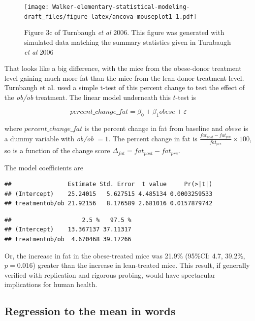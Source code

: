 \documentclass[]{book}
\begin{document}
\begin{figure}
\centering
\texttt{[image: Walker-elementary-statistical-modeling-draft\_files/figure-latex/ancova-mouseplot1-1.pdf]}
\caption{\label{fig:ancova-mouseplot1}Figure 3c of Turnbaugh \emph{et al}
2006. This figure was generated with simulated data matching the summary
statistics given in Turnbaugh \emph{et al} 2006}
\end{figure}

That looks like a big difference, with the mice from the obese-donor
treatment level gaining much more fat than the mice from the lean-donor
treatment level. Turnbaugh et al. used a simple t-test of this percent
change to test the effect of the \emph{ob/ob} treatment. The linear
model underneath this \(t\)-test is

\begin{equation}
percent\_change\_fat = \beta_0 + \beta_1 obese + \varepsilon
\end{equation}

where \(percent\_change\_fat\) is the percent change in fat from
baseline and \(obese\) is a dummy variable with \emph{ob/ob} \(= 1\).
The percent change in fat is
\(\frac{fat_{post} - fat_{pre}}{fat_{pre}} \times 100\), so is a
function of the change score \(\Delta_{fat} = fat_{post} - fat_{pre}\).

The model coefficients are

\begin{verbatim}
##                Estimate Std. Error  t value     Pr(>|t|)
## (Intercept)    25.24015   5.627515 4.485134 0.0003259533
## treatmentob/ob 21.92156   8.176589 2.681016 0.0157879742
\end{verbatim}

\begin{verbatim}
##                    2.5 %   97.5 %
## (Intercept)    13.367137 37.11317
## treatmentob/ob  4.670468 39.17266
\end{verbatim}

Or, the increase in fat in the obese-treated mice was 21.9\% (95\%CI:
4.7, 39.2\%, \(p=0.016\)) greater than the increase in lean-treated
mice. This result, if generally verified with replication and rigorous
probing, would have spectacular implications for human health.

\subsection{Regression to the mean in
words}\label{regression-to-the-mean-in-words}
\end{document}
